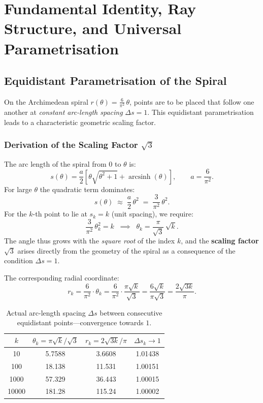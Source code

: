 \chapter{Fundamental Identity, Ray Structure, and Universal Parametrisation}
\label{sec:visualisierung}

\section{Equidistant Parametrisation of the Spiral}

On the Archimedean spiral $r(\theta) = \tfrac{6}{\pi^2}\,\theta$,
points are to be placed that follow one another at \emph{constant
arc-length spacing} $\Delta s = 1$. This equidistant parametrisation
leads to a characteristic geometric scaling factor.

\subsection{Derivation of the Scaling Factor \texorpdfstring{$\sqrt{3}$}{sqrt(3)}}

The arc length of the spiral from $0$ to $\theta$ is:
\[
  s(\theta)
  = \frac{a}{2}\!\left[\theta\sqrt{\theta^2+1}
    + \operatorname{arcsinh}(\theta)\right],
  \qquad a = \frac{6}{\pi^2}.
\]
For large $\theta$ the quadratic term dominates:
\[
  s(\theta) \;\approx\; \frac{a}{2}\,\theta^2
           \;=\; \frac{3}{\pi^2}\,\theta^2.
\]
For the $k$-th point to lie at $s_k = k$ (unit spacing), we require:
\[
  \frac{3}{\pi^2}\,\theta_k^2 = k
  \;\;\implies\;\;
  \theta_k = \frac{\pi}{\sqrt{3}}\,\sqrt{k}.
\]
The angle thus grows with the \emph{square root} of the index $k$, and the
\textbf{scaling factor $\sqrt{3}$} arises directly from the
geometry of the spiral as a consequence of the condition $\Delta s = 1$.

The corresponding radial coordinate:
\[
  r_k
  = \frac{6}{\pi^2}\cdot\theta_k
  = \frac{6}{\pi^2}\cdot\frac{\pi\sqrt{k}}{\sqrt{3}}
  = \frac{6\sqrt{k}}{\pi\sqrt{3}}
  = \frac{2\sqrt{3k}}{\pi}.
\]

\begin{table}[H]
\centering
\renewcommand{\arraystretch}{1.2}
\caption{Actual arc-length spacing $\Delta s$ between
  consecutive equidistant points---convergence towards $1$.}
\begin{tabular}{cccc}
\toprule
$k$ & $\theta_k = \pi\sqrt{k}/\sqrt{3}$ & $r_k = 2\sqrt{3k}/\pi$ & $\Delta s_k \to 1$ \\
\midrule
   10 & 5.7588 &  3.6608 & 1.01438 \\
  100 & 18.138 & 11.531  & 1.00151 \\
 1000 & 57.329 & 36.443  & 1.00015 \\
10000 & 181.28 & 115.24  & 1.00002 \\
\bottomrule
\end{tabular}
\end{table}

